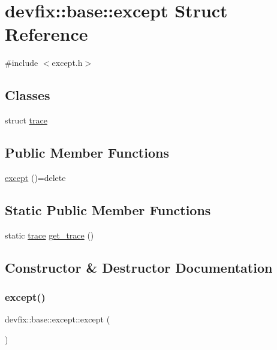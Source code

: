 \hypertarget{structdevfix_1_1base_1_1except}{}\section{devfix\+:\+:base\+:\+:except Struct Reference}
\label{structdevfix_1_1base_1_1except}


{\ttfamily \#include $<$except.\+h$>$}

\subsection*{Classes}
\begin{DoxyCompactItemize}
\item 
struct \hyperlink{structdevfix_1_1base_1_1except_1_1trace}{trace}
\end{DoxyCompactItemize}
\subsection*{Public Member Functions}
\begin{DoxyCompactItemize}
\item 
\hyperlink{structdevfix_1_1base_1_1except_ac62ca85895cf55e20e775cbce94abec6}{except} ()=delete
\end{DoxyCompactItemize}
\subsection*{Static Public Member Functions}
\begin{DoxyCompactItemize}
\item 
static \hyperlink{structdevfix_1_1base_1_1except_1_1trace}{trace} \hyperlink{structdevfix_1_1base_1_1except_a720b5e4d1edb889d3ac81b6fd6c18715}{get\+\_\+trace} ()
\end{DoxyCompactItemize}


\subsection{Constructor \& Destructor Documentation}
\mbox{\label{structdevfix_1_1base_1_1except_ac62ca85895cf55e20e775cbce94abec6}} 
\subsubsection{\texorpdfstring{except()}{except()}}
{\footnotesize\ttfamily devfix\+::base\+::except\+::except (\begin{DoxyParamCaption}{ }\end{DoxyParamCaption})\hspace{0.3cm}{\ttfamily [delete]}}



